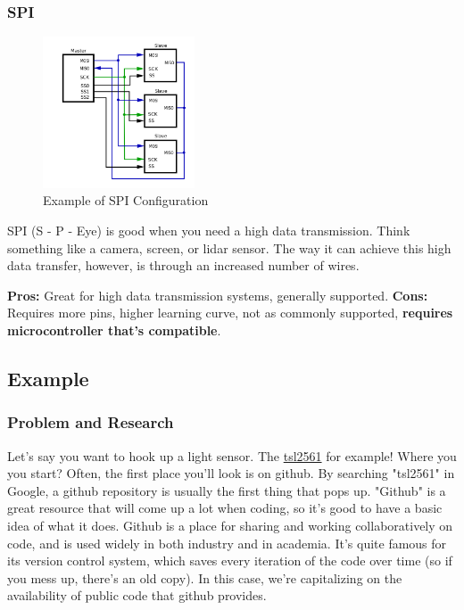 \documentclass[a4paper]{article}
\begin{document}
\subsubsection{SPI}
\label{sec:protocol}
\begin{figure}
  \begin{center}
    \includegraphics[width=0.4\textwidth]{spi.png}
  \end{center}
  \caption{Example of SPI Configuration}
\end{figure}

SPI (S - P - Eye) is good when you need a high data transmission. Think something like a camera, screen, or lidar sensor. The way it can achieve this high data transfer, however, is through an increased number of wires.

\newline \noindent
\textbf{Pros:} Great for high data transmission systems, generally supported.
\newline \noindent
\textbf{Cons:} Requires more pins, higher learning curve, not as commonly supported, \textbf{requires microcontroller that's compatible}.

\subsection{Example}
\subsubsection{Problem and Research}
Let's say you want to hook up a light sensor. The \href{https://www.adafruit.com/product/439}{tsl2561} for example! Where you you start? Often, the first place you'll look is on github. By searching "tsl2561" in Google, a github repository is usually the first thing that pops up. "Github" is a great resource that will come up a lot when coding, so it's good to have a basic idea of what it does. Github is a place for sharing and working collaboratively on code, and is used widely in both industry and in academia. It's quite famous for its version control system, which saves every iteration of the code over time (so if you mess up, there's an old copy). In this case, we're capitalizing on the availability of public code that github provides.
\end{document}
